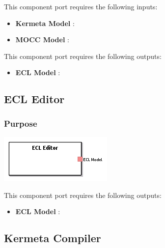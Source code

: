 \documentclass{gemoc} %
\begin{document}
This component port requires the following inputs:
\begin{itemize}
  \item \textbf{Kermeta Model} :
  \item \textbf{MOCC Model} :
\end{itemize}

This component port requires the following outputs:
\begin{itemize}
  \item \textbf{ECL Model} :
\end{itemize}

\subsection{ECL Editor}


\subsubsection{Purpose}

\begin{center}
\includegraphics*[trim=0.0cm 0.0cm 0cm 0.0cm, clip=true]{../images/generated/Generated_ECL_Editor.png}
\end{center}


This component port requires the following outputs:
\begin{itemize}
  \item \textbf{ECL Model} :
\end{itemize}

\subsection{Kermeta Compiler}
\end{document}
